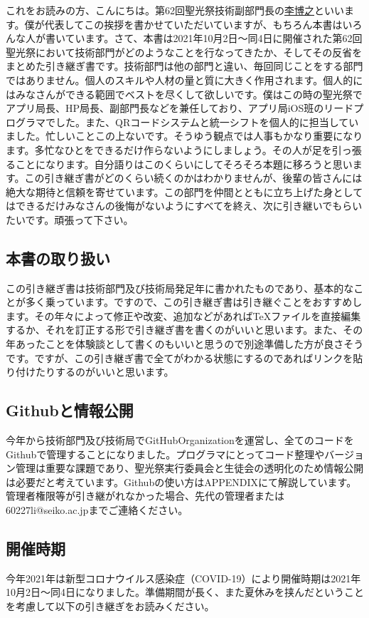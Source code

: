 \documentclass[dvipdfmx,jb5]{jarticle}
\newcommand{\mail}[2]{\href{#2}{#1}}
\begin{document}
これをお読みの方、こんにちは。第62回聖光祭技術副部門長の\mail{李博之}{60227li@seiko.ac.jp}といいます。僕が代表してこの挨拶を書かせていただいていますが、もちろん本書はいろんな人が書いています。さて、本書は2021年10月2日〜同4日に開催された第62回聖光祭において技術部門がどのようなことを行なってきたか、そしてその反省をまとめた引き継ぎ書です。技術部門は他の部門と違い、毎回同じことをする部門ではありません。個人のスキルや人材の量と質に大きく作用されます。個人的にはみなさんができる範囲でベストを尽くして欲しいです。僕はこの時の聖光祭でアプリ局長、HP局長、副部門長などを兼任しており、アプリ局iOS班のリードプログラマでした。また、QRコードシステムと統一シフトを個人的に担当していました。忙しいことこの上ないです。そうゆう観点では人事もかなり重要になります。多忙なひとをできるだけ作らないようにしましょう。その人が足を引っ張ることになります。自分語りはこのくらいにしてそろそろ本題に移ろうと思います。この引き継ぎ書がどのくらい続くのかはわかりませんが、後輩の皆さんには絶大な期待と信頼を寄せています。この部門を仲間とともに立ち上げた身としてはできるだけみなさんの後悔がないようにすべてを終え、次に引き継いでもらいたいです。頑張って下さい。
\subsection{本書の取り扱い}
この引き継ぎ書は技術部門及び技術局発足年に書かれたものであり、基本的なことが多く乗っています。ですので、この引き継ぎ書は引き継ぐことをおすすめします。その年々によって修正や改変、追加などがあれば\TeX ファイルを直接編集するか、それを訂正する形で引き継ぎ書を書くのがいいと思います。また、その年あったことを体験談として書くのもいいと思うので別途準備した方が良さそうです。ですが、この引き継ぎ書で全てがわかる状態にするのであればリンクを貼り付けたりするのがいいと思います。
\subsection{Githubと情報公開}
今年から技術部門及び技術局でGitHubOrganizationを運営し、全てのコードをGithubで管理することになりました。プログラマにとってコード整理やバージョン管理は重要な課題であり、聖光祭実行委員会と生徒会の透明化のため情報公開は必要だと考えています。Githubの使い方はAPPENDIXにて解説しています。管理者権限等が引き継がれなかった場合、先代の管理者または {\ttfamily 60227li@seiko.ac.jp}までご連絡ください。
\subsection{開催時期}
今年2021年は新型コロナウイルス感染症（COVID-19）により開催時期は2021年10月2日〜同4日になりました。準備期間が長く、また夏休みを挟んだということを考慮して以下の引き継ぎをお読みください。
\end{document}
